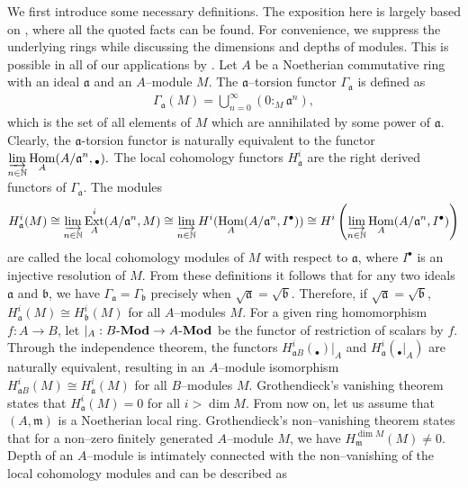 \documentclass{amsart}%
\theoremstyle{plain}
\numberwithin{equation}{section}
\theoremstyle{definition}
\DeclareMathOperator{\ext}{Ext}
\DeclareMathOperator{\Hom}{Hom}
\begin{document}
We first introduce some necessary definitions. The exposition here is largely based on \cite{broadmann, brunsherzog}, where all the quoted facts can be found. For convenience, we suppress the underlying rings while discussing the dimensions and depths of modules. This is possible in all of our applications by \cite[Exercise 1.2.26]{brunsherzog}. Let $A$ be a Noetherian commutative ring with an ideal $\mathfrak{a}$ and an $A$--module $M$. The $\mathfrak{a}$--torsion functor $\Gamma_{\mathfrak{a}}$ is defined as 
\begin{align*}
    \Gamma_{\mathfrak{a}}(M)=\bigcup_{n=0}^{\infty}\left( 0:_M \mathfrak{a}^n\right),
\end{align*}
which is the set of all elements of $M$ which are annihilated by some power of $\mathfrak{a}$. Clearly, the $\mathfrak{a}$-torsion functor is naturally equivalent to the functor $\displaystyle    \varinjlim_{n\in\mathbb N}\Hom_A(A/\mathfrak{a}^n,{}_\bullet).
$ The local cohomology functors $H^i_{\mathfrak{a}}$ are the right derived functors of $\Gamma_{\mathfrak{a}}$. The modules
\begin{align*}
    H^i_{\mathfrak{a}}(M)\cong\varinjlim_{n\in\mathbb N}\ext^i_A(A/\mathfrak{a}^n,M)\cong\varinjlim_{n\in\mathbb N}H^i(\Hom_A(A/\mathfrak{a}^n,I^\bullet))\cong H^i\left( \varinjlim_{n\in\mathbb N}\Hom_A(A/\mathfrak{a}^n,I^\bullet) \right)
\end{align*}
are called the local cohomology modules of $M$ with respect to $\mathfrak{a}$, where $I^\bullet$ is an injective resolution of $M$. From these definitions it follows that for any two ideals $\mathfrak{a}$ and $\mathfrak{b}$, we have $\Gamma_{\mathfrak{a}}=\Gamma_{\mathfrak{b}}$ precisely when $\sqrt{\mathfrak{a}}=\sqrt{\mathfrak{b}}$. Therefore, if $\sqrt{\mathfrak{a}}=\sqrt{\mathfrak{b}}$, $H^i_{\mathfrak{a}}(M)\cong H^i_{\mathfrak{b}}(M)$ for all $A$--modules $M$. For a given ring homomorphism $f:A\to B$, let $|_A:B\text{-\textbf{Mod}}\to A\text{-\textbf{Mod}}$ be the functor of restriction of scalars by $f$. Through the independence theorem, the functors $H^i_{\mathfrak{a}B}({}_\bullet)|_A$ and $H^i_{\mathfrak{a}}({}_\bullet|_A)$ are naturally equivalent, resulting in an $A$--module isomorphism $H^i_{\mathfrak{a}B}(M)\cong H^i_{\mathfrak{a}}(M)$ for all $B$--modules $M$. Grothendieck's vanishing theorem states that $H^i_{\mathfrak{a}}(M)=0$ for all $i>\dim M$. From now on, let us assume that $(A,\mathfrak{m})$ is a Noetherian local ring. Grothendieck's non--vanishing theorem states that for a non--zero finitely generated $A$--module $M$, we have $H^{\dim M}_{\mathfrak{m}}(M)\neq0$. Depth of an $A$--module is intimately connected with the non--vanishing of the local cohomology modules and can be described as
\end{document}
